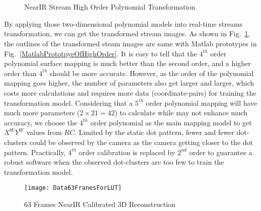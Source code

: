 %
\\\indent
\begin{figure}[!t]
\centering
\hspace*{-0.3cm}
%
%
\\%
\hspace*{-0.3cm}
%
%
\caption{NearIR Stream High Order Polynomial Transformation}
\label{HighOrderNearIRRectification}
\end{figure}%
%
By applying those two-dimensional polynomial models into real-time streams transformation, we can get the transformed stream images. As shown in Fig.~\ref{HighOrderNearIRRectification}, the outlines of the transformed steam images are same with Matlab prototypes in Fig.~\ref{MatlabPrototpyeOfHighOrder}. It is easy to tell that the \(4^{th}\) order polynomial surface mapping is much better than the second order, and a higher order than \(4^{th}\) should be more accurate. However, as the order of the polynomial mapping goes higher, the number of parameters also get larger and larger, which costs more calculations and requires more data (coordinate-pairs) for training the transformation model. Considering that a \(5^{th}\) order polynomial mapping will have much more  parameters ($2\times21=42$) to calculate while may not enhance much accuracy, we choose the \(4^{th}\) order polynomial as the main mapping model to get \(X^WY^W\) values from \(RC\). Limited by the static dot pattern, fewer and fewer dot-clusters could be observed by the camera as the camera getting closer to the dot pattern. Practically, \(4^{th}\) order calibration is replaced by \(2^{nd}\) order to guarantee a robust software when the observed dot-clusters are too few to train the transformation model.
\\\indent
%
\begin{figure}[t]
\centering
\texttt{[image: Data63FranesForLUT]}
\caption{63 Frames NearIR Calibrated 3D Reconstruction}
\label{Data63FranesForLUT}
\end{figure}%
